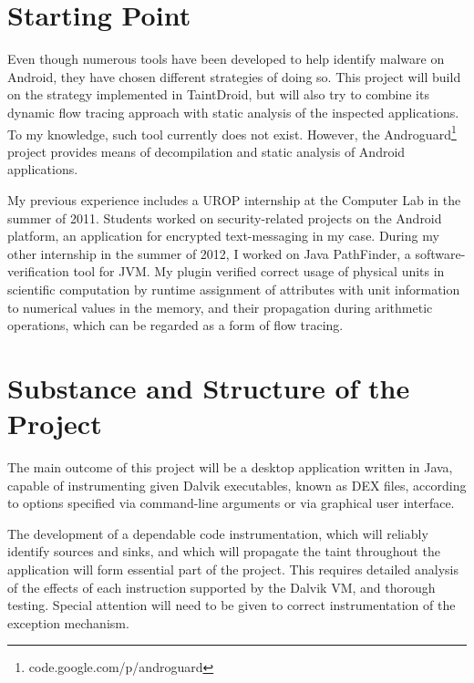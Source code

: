 \documentclass[12pt]{article}
\begin{document}
\section*{Starting Point}

Even though numerous tools have been developed to help identify malware on 
Android, they have chosen different strategies of doing so. This project
will build on the strategy implemented in TaintDroid, but will also try to 
combine its dynamic flow tracing approach with static analysis of the 
inspected applications. To my knowledge, such tool currently does not exist.
However, the Androguard\footnote{code.google.com/p/androguard} project provides
means of decompilation and static analysis of Android applications.

My previous experience includes a UROP internship at the Computer Lab
in the summer of 2011. Students worked on security-related projects on
the Android platform, an application for encrypted text-messaging in my
case. During my other internship in the summer of 2012, I worked on Java PathFinder,
a software-verification tool for JVM. My plugin verified correct usage of 
physical units in scientific computation by runtime assignment of attributes 
with unit information to numerical values in the memory, and their propagation 
during arithmetic operations, which can be regarded as a form of flow tracing. 

\section*{Substance and Structure of the Project}

The main outcome of this project will be a desktop application written 
in Java, capable of instrumenting given Dalvik executables, known as DEX
files, according to options specified via command-line arguments or via
graphical user interface.


The development of a dependable code instrumentation, which will reliably 
identify sources and sinks, and which will propagate the taint throughout 
the application will form essential part of the project. This requires 
detailed analysis of the effects of each instruction supported by the 
Dalvik VM, and thorough testing. Special attention will need to be given 
to correct instrumentation of the exception mechanism.
\end{document}
